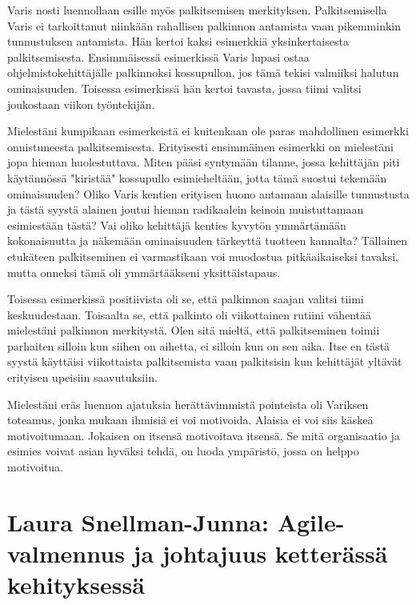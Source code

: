 \documentclass[a4paper]{article}
\begin{document}
Varis nosti luennollaan esille myös palkitsemisen merkityksen. Palkitsemisella Varis ei tarkoittanut niinkään rahallisen palkinnon antamista vaan pikemminkin tunnustuksen antamista. Hän kertoi kaksi esimerkkiä yksinkertaisesta palkitsemisesta. Ensimmäisessä esimerkissä Varis lupasi ostaa ohjelmistokehittäjälle palkinnoksi kossupullon, jos tämä tekisi valmiiksi halutun ominaisuuden. Toisessa esimerkissä hän kertoi tavasta, jossa tiimi valitsi joukostaan viikon työntekijän.

Mielestäni kumpikaan esimerkeistä ei kuitenkaan ole paras mahdollinen esimerkki onnistuneesta palkitsemisesta. Erityisesti ensimmäinen esimerkki on mielestäni jopa hieman huolestuttava. Miten pääsi syntymään tilanne, jossa kehittäjän piti käytännössä "kiristää" kossupullo esimieheltään, jotta tämä suostui tekemään ominaisuuden? Oliko Varis kentien erityisen huono antamaan alaisille tunnustusta ja tästä syystä alainen joutui hieman radikaalein keinoin muistuttamaan esimiestään tästä? Vai oliko kehittäjä kenties kyvytön ymmärtämään kokonaisuutta ja näkemään ominaisuuden tärkeyttä tuotteen kannalta? Tällainen etukäteen palkitseminen ei varmastikaan voi muodostua pitkäaikaiseksi tavaksi, mutta onneksi tämä oli ymmärtääkseni yksittäistapaus.

Toisessa esimerkissä positiivista oli se, että palkinnon saajan valitsi tiimi keskuudestaan. Toisaalta se, että palkinto oli viikottainen rutiini vähentää mielestäni palkinnon merkitystä. Olen sitä mieltä, että palkitseminen toimii parhaiten silloin kun siihen on aihetta, ei silloin kun on sen aika. Itse en tästä syystä käyttäisi viikottaista palkitsemista vaan palkitsisin kun kehittäjät yltävät erityisen upeisiin saavutuksiin.

Mielestäni eräs luennon ajatuksia herättävimmistä pointeista oli Variksen toteamus, jonka mukaan ihmisiä ei voi motivoida. Alaisia ei voi siis käskeä motivoitumaan. Jokaisen on itsensä motivoitava itsensä. Se mitä organisaatio ja esimies voivat asian hyväksi tehdä, on luoda ympäristö, jossa on helppo motivoitua.







\section{Laura Snellman-Junna: Agile-valmennus ja johtajuus ketterässä kehityksessä}


% 

% 
% 
\end{document}
